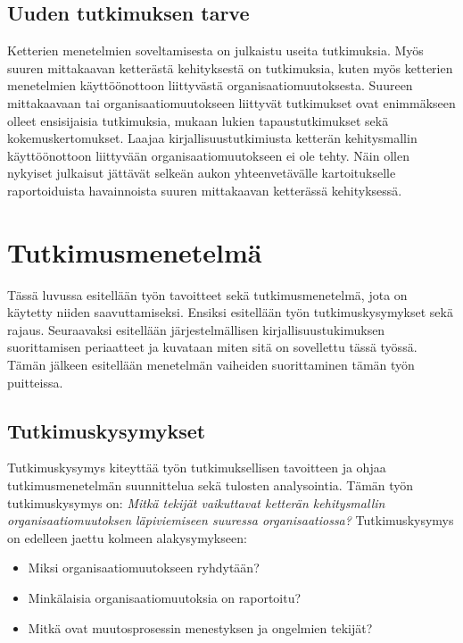 \subsection{Uuden tutkimuksen tarve}
Ketterien menetelmien soveltamisesta on julkaistu useita tutkimuksia. Myös
suuren mittakaavan ketterästä kehityksestä on tutkimuksia, kuten myös ketterien
menetelmien käyttöönottoon liittyvästä organisaatiomuutoksesta. Suureen
mittakaavaan tai organisaatiomuutokseen liittyvät tutkimukset ovat enimmäkseen
olleet ensisijaisia tutkimuksia, mukaan lukien tapaustutkimukset sekä
kokemuskertomukset. Laajaa kirjallisuustutkimiusta ketterän kehitysmallin
käyttöönottoon liittyvään organisaatiomuutokseen ei ole tehty. Näin ollen
nykyiset julkaisut jättävät selkeän aukon yhteenvetävälle kartoitukselle
raportoiduista havainnoista suuren mittakaavan ketterässä kehityksessä.

\clearpage
\section{Tutkimusmenetelmä}
\label{sec:menetelma}

Tässä luvussa esitellään työn tavoitteet sekä tutkimusmenetelmä, jota on
käytetty niiden saavuttamiseksi. Ensiksi esitellään työn tutkimuskysymykset sekä
rajaus. Seuraavaksi esitellään järjestelmällisen kirjallisuustukimuksen
suorittamisen periaatteet ja kuvataan miten sitä on sovellettu tässä työssä.
Tämän jälkeen esitellään menetelmän vaiheiden suorittaminen tämän työn
puitteissa.

\subsection{Tutkimuskysymykset}
Tutkimuskysymys kiteyttää työn tutkimuksellisen tavoitteen ja ohjaa
tutkimusmenetelmän suunnittelua sekä tulosten analysointia. Tämän työn
tutkimuskysymys on: \textit{Mitkä tekijät vaikuttavat ketterän kehitysmallin
organisaatiomuutoksen läpiviemiseen suuressa organisaatiossa?} Tutkimuskysymys
on edelleen jaettu kolmeen alakysymykseen:

\begin{itemize}
\item Miksi organisaatiomuutokseen ryhdytään?
\item Minkälaisia organisaatiomuutoksia on raportoitu?
\item Mitkä ovat muutosprosessin menestyksen ja ongelmien tekijät?
\end{itemize}

